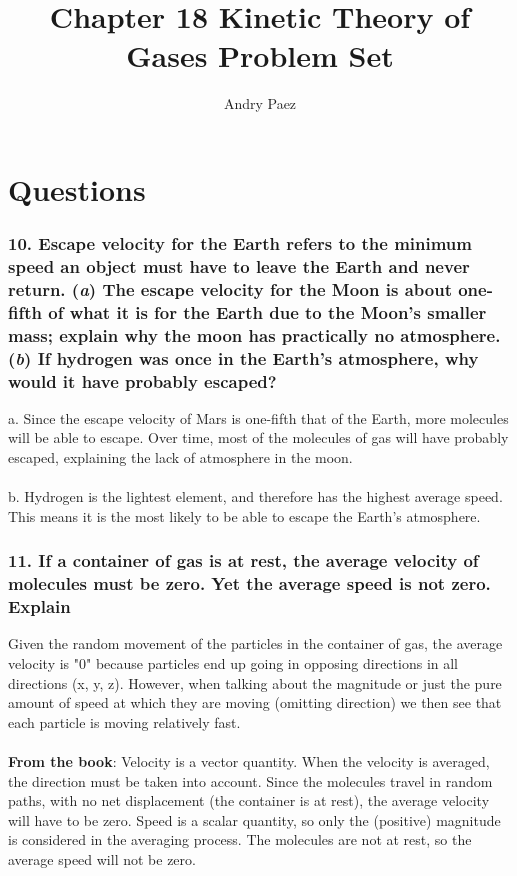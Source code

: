 \documentclass{article}
\title{Chapter 18 Kinetic Theory of Gases Problem Set}
\author{Andry Paez}
\date{}
\begin{document}
\maketitle

\section*{Questions}

\subsubsection*{10. Escape velocity for the Earth refers to the minimum speed an object must have to leave the Earth and never return. (\textit{a}) The escape velocity for the Moon is about one-fifth of what it is for the Earth due to the Moon's smaller mass; explain why the moon has practically no atmosphere. (\textit{b}) If hydrogen was once in the Earth's atmosphere, why would it have probably escaped?}
a. Since the escape velocity of Mars is one-fifth that of the Earth, more molecules will be able to escape. Over time, most of the molecules of gas will have probably escaped, explaining the lack of atmosphere in the moon. 
\\
\\
b. Hydrogen is the lightest element, and therefore has the highest average speed. This means it is the most likely to be able to escape the Earth's atmosphere.
\subsubsection*{11. If a container of gas is at rest, the average velocity of molecules must be zero. Yet the average speed is not zero. Explain}
Given the random movement of the particles in the container of gas, the average velocity is "0" because particles end up going in opposing directions in all directions (x, y, z). However, when talking about the magnitude or just the pure amount of speed at which they are moving (omitting direction) we then see that each particle is moving relatively fast.
\\ \\
\textbf{From the book}: Velocity is a vector quantity. When the velocity is averaged, the direction must be taken into account. Since the molecules travel in random paths, with no net displacement (the container is at rest), the average velocity will have to be zero. Speed is a scalar quantity, so only the (positive) magnitude is considered in the averaging process. The molecules are not at rest, so the average speed will not be zero.
\end{document}
